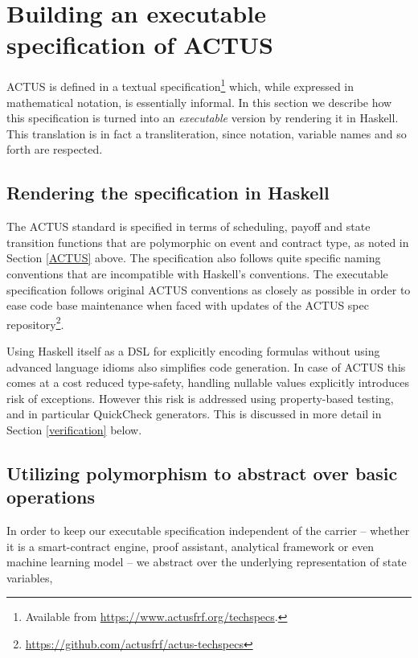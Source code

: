 \documentclass[runningheads]{llncs}
\begin{document}
\section{Building an executable specification of ACTUS}
\label{executable}

ACTUS is defined in a textual specification\footnote{Available from \url{https://www.actusfrf.org/techspecs}.} which, while expressed in mathematical notation, is essentially informal. In this section we describe how this specification is turned into an \emph{executable} version by rendering it in Haskell. This translation is in fact a transliteration, since notation, variable names and so forth are respected.

\subsection{Rendering the specification in Haskell}

The ACTUS standard is specified in terms of scheduling, payoff and
state transition functions that are polymorphic on event and contract
type, as noted in Section \ref{ACTUS} above. The specification also follows quite specific naming conventions
that are incompatible with Haskell's conventions. The executable specification
follows original ACTUS conventions as closely as possible in order to
ease code base maintenance when faced with updates of the ACTUS
spec repository\footnote{\url{https://github.com/actusfrf/actus-techspecs}}.

Using Haskell itself as a DSL for explicitly encoding formulas without
using advanced language idioms also simplifies code generation. 
In case of ACTUS this comes at a cost reduced type-safety, handling nullable
values explicitly introduces risk of exceptions. However this risk
is addressed using property-based testing, and in particular QuickCheck generators. This is discussed in more detail in Section \ref{verification} below.

\subsection{Utilizing polymorphism to abstract over basic operations}

In order to keep our executable specification independent of the carrier -- whether it is a smart-contract engine, proof assistant, analytical framework
or even machine learning model -- we abstract over the underlying representation
of state variables,
\end{document}
